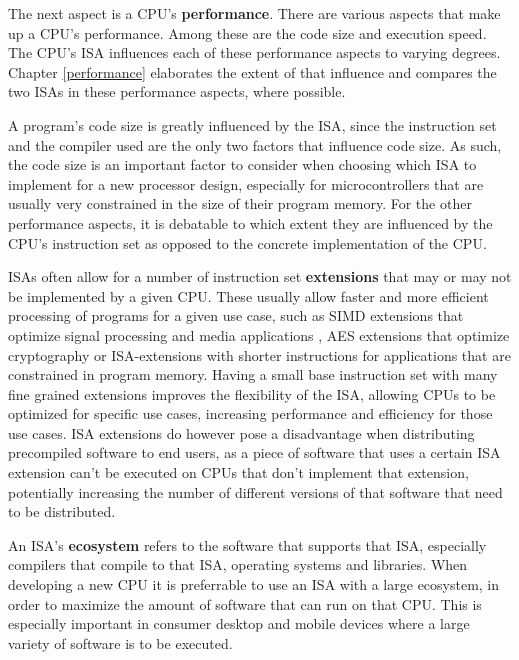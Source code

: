\documentclass[conference]{IEEEtran}
\begin{document}
The next aspect is a \gls{CPU}'s \textbf{performance}. There are various aspects that make up a \gls{CPU}'s performance.
Among these are the code size and execution speed.
The \gls{CPU}'s \gls{ISA} influences each of these performance aspects to varying degrees. Chapter \ref{performance} elaborates
the extent of that influence and compares the two \glspl{ISA} in these performance aspects, where possible.

A program's code size is greatly influenced by the \gls{ISA}, since the instruction set and the compiler used are the only two factors that influence
code size. As such, the code size is an important factor to consider when choosing which \gls{ISA} to implement for a new processor design, especially
for microcontrollers that are usually very constrained in the size of their program memory.
For the other performance aspects, it is debatable to which extent they are influenced by the \gls{CPU}'s instruction set as opposed
to the concrete implementation of the CPU. \cite{Blem2013} \cite{Akram2017}

\glspl{ISA} often allow for a number of instruction set \textbf{extensions} that may or may not be implemented by a given \gls{CPU}. These usually allow
faster and more efficient processing of programs for a given use case, such as \gls{SIMD} extensions that optimize signal processing and media applications \cite[page 52]{Arm2020},
\gls{AES} extensions that optimize cryptography \cite{Arm2015} or \gls{ISA}-extensions with shorter instructions for applications that are constrained in program memory. \cite{Arm2005}
Having a small base instruction set with many fine grained extensions improves the flexibility of the \gls{ISA}, allowing \glspl{CPU} to be optimized for specific
use cases, increasing performance and efficiency for those use cases. \gls{ISA} extensions do however pose a disadvantage when distributing precompiled software
to end users, as a piece of software that uses a certain \gls{ISA} extension can't be executed on \glspl{CPU} that don't implement that extension, potentially
increasing the number of different versions of that software that need to be distributed.

An \gls{ISA}'s \textbf{ecosystem} refers to the software that supports that \gls{ISA}, especially compilers that compile to that \gls{ISA}, operating systems and libraries.
When developing a new \gls{CPU} it is preferrable to use an \gls{ISA} with a large ecosystem, in order to maximize the amount of software
that can run on that \gls{CPU}. This is especially important in consumer desktop and mobile devices where a large variety of software is to be executed.
\end{document}
